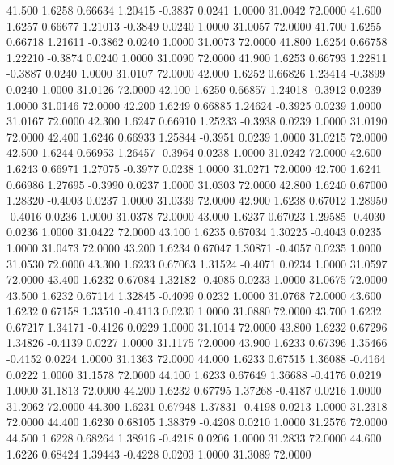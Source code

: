   41.500   1.6258   0.66634   1.20415  -0.3837   0.0241   1.0000  31.0042  72.0000
  41.600   1.6257   0.66677   1.21013  -0.3849   0.0240   1.0000  31.0057  72.0000
  41.700   1.6255   0.66718   1.21611  -0.3862   0.0240   1.0000  31.0073  72.0000
  41.800   1.6254   0.66758   1.22210  -0.3874   0.0240   1.0000  31.0090  72.0000
  41.900   1.6253   0.66793   1.22811  -0.3887   0.0240   1.0000  31.0107  72.0000
  42.000   1.6252   0.66826   1.23414  -0.3899   0.0240   1.0000  31.0126  72.0000
  42.100   1.6250   0.66857   1.24018  -0.3912   0.0239   1.0000  31.0146  72.0000
  42.200   1.6249   0.66885   1.24624  -0.3925   0.0239   1.0000  31.0167  72.0000
  42.300   1.6247   0.66910   1.25233  -0.3938   0.0239   1.0000  31.0190  72.0000
  42.400   1.6246   0.66933   1.25844  -0.3951   0.0239   1.0000  31.0215  72.0000
  42.500   1.6244   0.66953   1.26457  -0.3964   0.0238   1.0000  31.0242  72.0000
  42.600   1.6243   0.66971   1.27075  -0.3977   0.0238   1.0000  31.0271  72.0000
  42.700   1.6241   0.66986   1.27695  -0.3990   0.0237   1.0000  31.0303  72.0000
  42.800   1.6240   0.67000   1.28320  -0.4003   0.0237   1.0000  31.0339  72.0000
  42.900   1.6238   0.67012   1.28950  -0.4016   0.0236   1.0000  31.0378  72.0000
  43.000   1.6237   0.67023   1.29585  -0.4030   0.0236   1.0000  31.0422  72.0000
  43.100   1.6235   0.67034   1.30225  -0.4043   0.0235   1.0000  31.0473  72.0000
  43.200   1.6234   0.67047   1.30871  -0.4057   0.0235   1.0000  31.0530  72.0000
  43.300   1.6233   0.67063   1.31524  -0.4071   0.0234   1.0000  31.0597  72.0000
  43.400   1.6232   0.67084   1.32182  -0.4085   0.0233   1.0000  31.0675  72.0000
  43.500   1.6232   0.67114   1.32845  -0.4099   0.0232   1.0000  31.0768  72.0000
  43.600   1.6232   0.67158   1.33510  -0.4113   0.0230   1.0000  31.0880  72.0000
  43.700   1.6232   0.67217   1.34171  -0.4126   0.0229   1.0000  31.1014  72.0000
  43.800   1.6232   0.67296   1.34826  -0.4139   0.0227   1.0000  31.1175  72.0000
  43.900   1.6233   0.67396   1.35466  -0.4152   0.0224   1.0000  31.1363  72.0000
  44.000   1.6233   0.67515   1.36088  -0.4164   0.0222   1.0000  31.1578  72.0000
  44.100   1.6233   0.67649   1.36688  -0.4176   0.0219   1.0000  31.1813  72.0000
  44.200   1.6232   0.67795   1.37268  -0.4187   0.0216   1.0000  31.2062  72.0000
  44.300   1.6231   0.67948   1.37831  -0.4198   0.0213   1.0000  31.2318  72.0000
  44.400   1.6230   0.68105   1.38379  -0.4208   0.0210   1.0000  31.2576  72.0000
  44.500   1.6228   0.68264   1.38916  -0.4218   0.0206   1.0000  31.2833  72.0000
  44.600   1.6226   0.68424   1.39443  -0.4228   0.0203   1.0000  31.3089  72.0000
